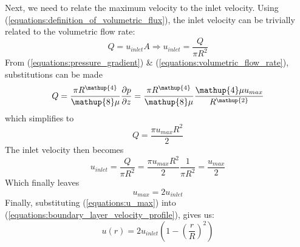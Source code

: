 \newpage
Next, we need to relate the maximum velocity to the inlet velocity. Using (\ref{equations:definition_of_volumetric_flux}), the inlet velocity can be trivially related to the volumetric flow rate:
\begin{equation}
    Q = u_{inlet}A \Rightarrow u_{inlet} = \frac{Q}{\pi R^\mathup{2}}
\end{equation}
From (\ref{equations:pressure_gradient}) \& (\ref{equations:volumetric_flow_rate}), substitutions can be made
\begin{equation}
    Q = \frac{\pi R^\mathup{4}}{\mathup{8}\mu}\pdv{p}{z} = \frac{\pi R^\mathup{4}}{\mathup{8}\mu} \frac{\mathup{4}\mu u_{max}}{R^\mathup{2}}
\end{equation}
which simplifies to
\begin{equation}
    Q = \frac{\pi u_{max} R^\mathup{2}}{\mathup{2}}
\end{equation}
The inlet velocity then becomes
\begin{equation}
    u_{inlet} = \frac{Q}{\pi R^\mathup{2}} =\frac{\pi u_{max} R^\mathup{2}}{\mathup{2}}\frac{\mathup{1}}{\pi R^\mathup{2}} = \frac{u_{max}}{\mathup{2}}
\end{equation}
Which finally leaves
\begin{equation}
\label{equations:u_max}
    u_{max} = \mathup{2}u_{inlet}
\end{equation}
Finally, substituting (\ref{equations:u_max}) into (\ref{equations:boundary_layer_velocity_profile}), gives us:
\begin{equation}
    u(r) = \mathup{2}u_{inlet}\left(\mathup{1} - \left(\frac{r}{R}\right)^\mathup{2}\right)
\end{equation}
\newpage

